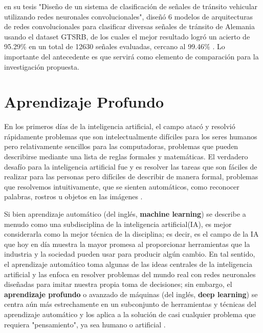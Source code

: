 		\citep{Ayuque2016} en su tesis "Diseño de un sistema de clasificación de señales de tránsito vehicular utilizando redes neuronales convolucionales", diseñó 6 modelos de arquitecturas de redes convolucionales para clasificar diversas señales de tránsito de Alemania usando el dataset GTSRB, de los cuales el mejor resultado logró un acierto de 95.29\% en un total de 12630 señales evaluadas, cercano al 99.46\% \citep{Ciresan}. Lo importante del antecedente es que servirá como elemento de comparación para la investigación propuesta. 
		


\section{Aprendizaje Profundo} 
	En los primeros días de la inteligencia artificial, el campo atacó y resolvió rápidamente problemas que son intelectualmente difíciles para los seres humanos pero relativamente sencillos para las computadoras, problemas que pueden describirse mediante una lista de reglas formales y matemáticas. El verdadero desafío para la inteligencia artificial fue y es resolver las tareas que son fáciles de realizar para las personas pero difíciles de describir de manera formal, problemas que resolvemos intuitivamente, que se sienten automáticos, como reconocer palabras, rostros u objetos en las imágenes \citep{Goodfellow-et-al-2016}.

	
	Si bien aprendizaje automático (del inglés, {\bf machine learning}) se describe a menudo como una subdisciplina de la inteligencia artificial(IA), es mejor considerarla como la mejor técnica de la disciplina; es decir, es el campo de la IA que hoy en día muestra la mayor promesa al proporcionar herramientas que la industria y la sociedad pueden usar para producir algún cambio. En tal sentido, el aprendizaje automático toma algunas de las ideas centrales de la inteligencia artificial y las enfoca en resolver problemas del mundo real con redes neuronales diseñadas para imitar nuestra propia toma de decisiones; sin embargo, el {\bf aprendizaje profundo} o avanzado de máquinas (del inglés, {\bf deep learning}) se centra aún más estrechamente en un subconjunto de herramientas y técnicas del aprendizaje automático y los aplica a la solución de casi cualquier problema que requiera "pensamiento", ya sea humano o artificial \citep{Goodfellow-et-al-2016}.

